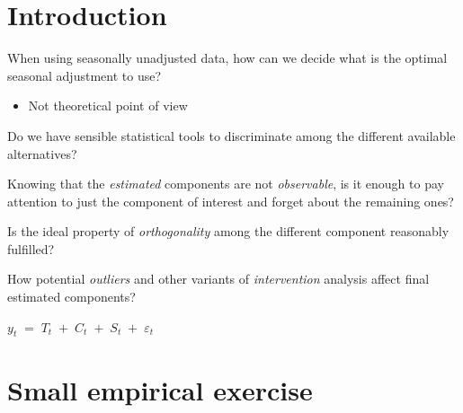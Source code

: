 
 \section{Introduction}
\begin{slide}
  \begin{wideitemize}
  \item <1> When using seasonally unadjusted data, how can we decide what
    is the optimal seasonal adjustment to use?%
    \begin{itemize}
    \item Not theoretical point of view
    \end{itemize}
    
  \item<2> Do we have sensible statistical tools to discriminate among
    the different available alternatives?%
  \item<2> Knowing that the \emph{estimated} components are not
    \emph{observable}, is it enough to pay attention to just the
    component of interest and forget about the remaining ones?%
  \item<2> Is the ideal property of \emph{orthogonality} among the
    different component reasonably fulfilled?
  \item<3> How potential \emph{outliers} and other variants of
    \emph{intervention} analysis affect final estimated components?
  \end{wideitemize}
\end{slide}

\begin{slide}
  
  \begin{center}
    \LARGE
    \begin{math}
      y_t\;=\;T_t\;+\;C_t\;+\;S_t\;+\;\varepsilon_t
    \end{math}
  \end{center}
  
\end{slide}


\section[Exercise]{Small empirical exercise}

